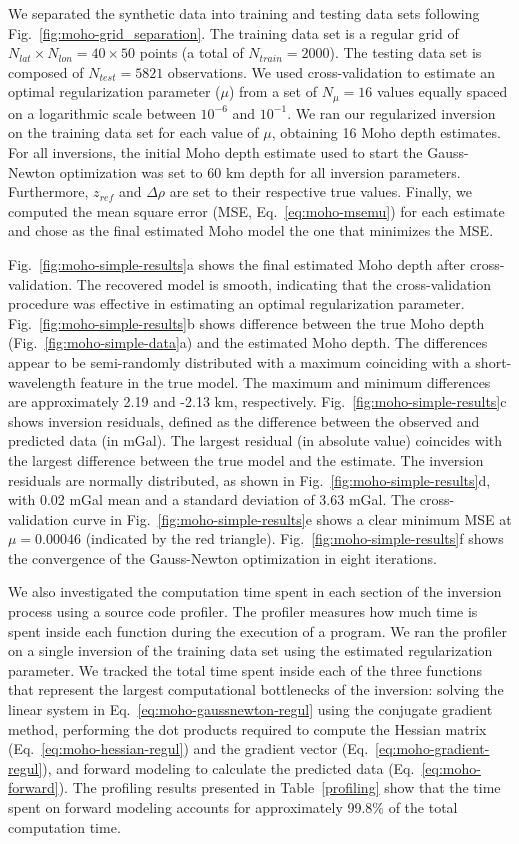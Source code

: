 We separated the synthetic data into training and testing data sets
following Fig.~\ref{fig:moho-grid_separation}.
The training data set is a regular grid of
$N_{lat} \times N_{lon} = 40 \times 50$ points
(a total of $N_{train} = 2000$).
The testing data set is composed of $N_{test} = 5821$ observations.
We used cross-validation to estimate an optimal regularization parameter ($\mu$)
from a set of $N_\mu = 16$ values equally spaced on a logarithmic scale
between $10^{-6}$ and $10^{-1}$.
We ran our regularized inversion on the training data set
for each value of $\mu$,
obtaining 16 Moho depth estimates.
For all inversions, the initial Moho depth estimate
used to start the Gauss-Newton optimization
was set to 60 km depth for all inversion parameters.
Furthermore, $z_{ref}$ and $\Delta\rho$ are set to their respective true values.
Finally, we computed the mean square error (MSE, Eq.~\ref{eq:moho-msemu})
for each estimate and chose as the final estimated Moho model
the one that minimizes the MSE.

Fig.~\ref{fig:moho-simple-results}a shows the final estimated Moho depth
after cross-validation.
The recovered model is smooth, indicating that the cross-validation procedure
was effective in estimating an optimal regularization parameter.
Fig.~\ref{fig:moho-simple-results}b shows difference between the true Moho depth
(Fig.~\ref{fig:moho-simple-data}a) and the estimated Moho depth.
The differences appear to be semi-randomly distributed with a maximum
coinciding with a short-wavelength feature in the true model.
The maximum and minimum differences are approximately
2.19 and -2.13 km, respectively.
Fig.~\ref{fig:moho-simple-results}c shows inversion residuals, defined as the
difference between the observed and predicted data (in mGal).
The largest residual (in absolute value) coincides with the largest difference
between the true model and the estimate.
The inversion residuals are normally distributed,
as shown in Fig.~\ref{fig:moho-simple-results}d,
with 0.02 mGal mean and a standard deviation of 3.63 mGal.
The cross-validation curve in Fig.~\ref{fig:moho-simple-results}e
shows a clear minimum MSE at $\mu = 0.00046$
(indicated by the red triangle).
Fig.~\ref{fig:moho-simple-results}f shows the convergence of
the Gauss-Newton optimization in eight iterations.

We also investigated the computation time spent in each section of the inversion
process using a source code profiler.
The profiler measures how much time is spent inside each function during
the execution of a program.
We ran the profiler on a single inversion of the training data set
using the estimated regularization parameter.
We tracked the total time spent inside each of the three functions
that represent the largest computational bottlenecks of the inversion:
solving the linear system in Eq.~\ref{eq:moho-gaussnewton-regul}
using the conjugate gradient method,
performing the dot products required to compute
the Hessian matrix (Eq.~\ref{eq:moho-hessian-regul})
and the gradient vector (Eq.~\ref{eq:moho-gradient-regul}),
and forward modeling to calculate the predicted data (Eq.~\ref{eq:moho-forward}).
The profiling results presented in Table~\ref{profiling}
show that the time spent on forward modeling accounts for approximately
99.8\% of the total computation time.


